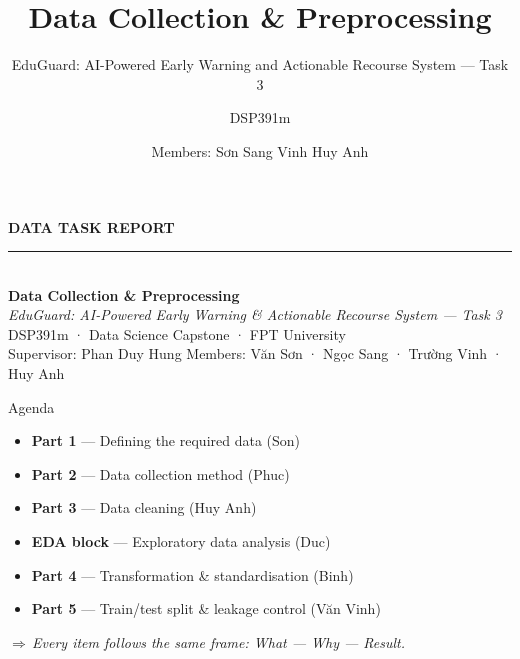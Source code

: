\documentclass[aspectratio=169,11pt]{beamer}
\title{\textbf{Data Collection \& Preprocessing}}
\subtitle{EduGuard: AI-Powered Early Warning and Actionable Recourse System --- Task 3}
\author{DSP391m}
\institute{FPT University \textbullet{} Supervisor: Phan Duy Hung}
\date{Members: Sơn \textbullet{} Sang \textbullet{} Vinh \textbullet{} Huy Anh}
\newcommand{\takeaway}[1]{\vspace{2pt}\par{\footnotesize\itshape\textcolor{themecol}{$\Rightarrow$\,}#1}}
\begin{document}
{
\begin{frame}[plain]
  \vfill\hspace{1.1em}\begin{minipage}{0.92\textwidth}
    {\color{white!85}\large\textbf{DATA TASK REPORT}}\\[6pt]
    {\color{white}\rule{3.2cm}{2.4pt}}\\[10pt]
    {\color{white}\huge\textbf{Data Collection \& Preprocessing}}\\[10pt]
    {\color{white!90}\large\itshape EduGuard: AI-Powered Early Warning \& Actionable Recourse System --- Task 3}\\[16pt]
    {\color{white!80}\small DSP391m · Data Science Capstone · FPT University\\
     Supervisor: Phan Duy Hung \quad\textbullet\quad Members: Văn Sơn · Ngọc Sang · Trường Vinh · Huy Anh}
  \end{minipage}\vfill
\end{frame}}

\begin{frame}{Agenda}
  \begin{itemize}\setlength\itemsep{0.5em}
    \item \textbf{Part 1} — Defining the required data \hfill(Son)
    \item \textbf{Part 2} — Data collection method \hfill(Phuc)
    \item \textbf{Part 3} — Data cleaning \hfill(Huy Anh)
    \item \textbf{EDA block} — Exploratory data analysis \hfill(Duc)
    \item \textbf{Part 4} — Transformation \& standardisation \hfill(Binh)
    \item \textbf{Part 5} — Train/test split \& leakage control \hfill(Văn Vinh)
  \end{itemize}
  \takeaway{Every item follows the same frame: \textit{What — Why — Result}.}
\end{frame}
\end{document}
